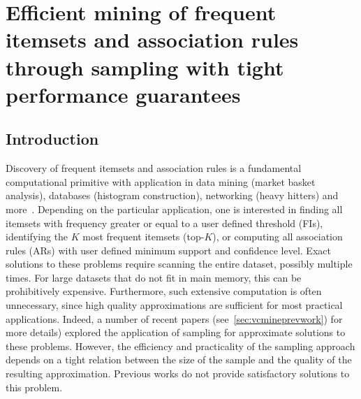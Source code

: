 \chapter{Efficient mining of frequent itemsets and association rules through
sampling with tight performance guarantees}\label{ch:vcmine}

\section{Introduction}\label{sec:vcmineintro}
Discovery of frequent itemsets and association rules is a fundamental
computational primitive with application in data mining (market basket
analysis), databases (histogram construction), networking (heavy hitters) and
more~\cite[Sect.~5]{HanCXY07}. Depending on the particular application, one is
interested in finding all itemsets with frequency greater or equal to a user
defined threshold (FIs), identifying the $K$ most frequent itemsets (top-$K$),
or computing all association rules (ARs) with user defined minimum  support and
confidence level. Exact solutions to these problems require scanning the entire
dataset, possibly multiple times. For large datasets that do not fit in main
memory, this can be prohibitively expensive. Furthermore, such extensive
computation is often unnecessary, since high quality approximations are
sufficient for most practical applications.  Indeed, a number of recent
papers (see~\ref{sec:vcmineprevwork}) for more details)
explored the application of sampling for approximate solutions to these
problems. However, the efficiency and practicality of the sampling approach
depends on a tight relation between the size of the sample and the quality of
the resulting approximation. Previous works do not provide satisfactory
solutions to this problem.

